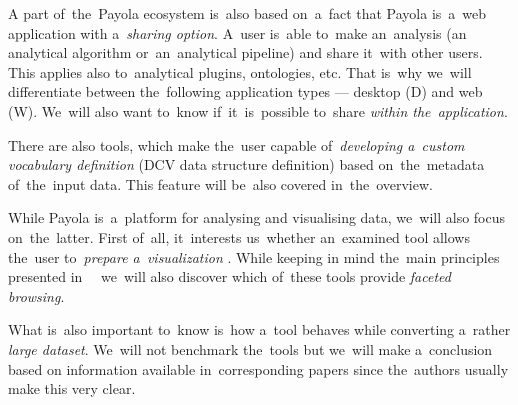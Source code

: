 A part of~the~Payola ecosystem is~also based on~a~fact that Payola is~a~web 
application with a~\emph{sharing option}. A~user is~able to~make an~analysis (an
analytical algorithm or~an~analytical pipeline) and share it~with other users. This applies also to~analytical plugins, ontologies, etc. That is~why we~will differentiate between the~following
application types --- desktop (D) and web (W). We~will also want to~know if~it~is~possible to~share \emph{within the~application}.

There are also tools, which make the~user capable of~\emph{developing a~custom vocabulary 
definition} (DCV data structure definition) based on~the~metadata of~the~input data.
This feature will be~also covered in~the~overview.

While Payola is~a~platform for analysing and visualising data, we~will also 
focus on~the~latter. First of~all, it~interests us~whether 
an~examined tool allows the~user to~\emph{prepare a~visualization} . While keeping 
in mind the~main principles presented in~~\cite{mantra} we~will also discover 
which of~these tools provide \emph{faceted browsing}.

What is~also important to~know is~how a~tool behaves while converting a~rather 
\emph{large dataset}. We~will not benchmark the~tools but we~will make a~conclusion based 
on information available in~corresponding papers since the~authors usually make 
this very clear.

\vspace{0.5cm}

